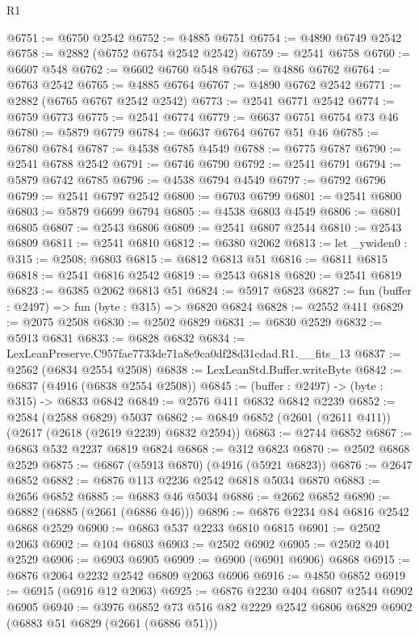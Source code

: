 \begin{lexlean}{R1}
\begin{coremodule}
@6751 := @6750 @2542
@6752 := @4885 @6751
@6754 := @4890 @6749 @2542
@6758 := @2882 (@6752 @6754 @2542 @2542)
@6759 := @2541 @6758
@6760 := @6607 @548
@6762 := @6602 @6760 @548
@6763 := @4886 @6762
@6764 := @6763 @2542
@6765 := @4885 @6764
@6767 := @4890 @6762 @2542
@6771 := @2882 (@6765 @6767 @2542 @2542)
@6773 := @2541 @6771 @2542
@6774 := @6759 @6773
@6775 := @2541 @6774
@6779 := @6637 @6751 @6754 @73 @46
@6780 := @5879 @6779
@6784 := @6637 @6764 @6767 @51 @46
@6785 := @6780 @6784
@6787 := @4538 @6785 @4549
@6788 := @6775 @6787
@6790 := @2541 @6788 @2542
@6791 := @6746 @6790
@6792 := @2541 @6791
@6794 := @5879 @6742 @6785
@6796 := @4538 @6794 @4549
@6797 := @6792 @6796
@6799 := @2541 @6797 @2542
@6800 := @6703 @6799
@6801 := @2541 @6800
@6803 := @5879 @6699 @6794
@6805 := @4538 @6803 @4549
@6806 := @6801 @6805
@6807 := @2543 @6806
@6809 := @2541 @6807 @2544
@6810 := @2543 @6809
@6811 := @2541 @6810
@6812 := @6380 @2062
@6813 := let _ywiden0 : @315 := @2508; @6803
@6815 := @6812 @6813 @51
@6816 := @6811 @6815
@6818 := @2541 @6816 @2542
@6819 := @2543 @6818
@6820 := @2541 @6819
@6823 := @6385 @2062 @6813 @51
@6824 := @5917 @6823
@6827 := fun (buffer : @2497) => fun (byte : @315) => @6820 @6824
@6828 := @2552 @411
@6829 := @2075 @2508
@6830 := @2502 @6829
@6831 := @6830 @2529
@6832 := @5913 @6831
@6833 := @6828 @6832
@6834 := LexLeanPreserve.C957fae7733de71a8e9ca0df28d31cdad.R1.__fits_13
@6837 := @2562 (@6834 @2554 @2508)
@6838 := LexLeanStd.Buffer.writeByte
@6842 := @6837 (@4916 (@6838 @2554 @2508))
@6845 := (buffer : @2497) -> (byte : @315) -> @6833 @6842
@6849 := @2576 @411 @6832 @6842 @2239
@6852 := @2584 (@2588 @6829) @5037
@6862 := @6849 @6852 (@2601 (@2611 @411)) (@2617 (@2618 (@2619 @2239) @6832 @2594))
@6863 := @2744 @6852
@6867 := @6863 @532 @2237 @6819 @6824
@6868 := @312 @6823
@6870 := @2502 @6868 @2529
@6875 := @6867 (@5913 @6870) (@4916 (@5921 @6823))
@6876 := @2647 @6852
@6882 := @6876 @113 @2236 @2542 @6818 @5034 @6870
@6883 := @2656 @6852
@6885 := @6883 @46 @5034
@6886 := @2662 @6852
@6890 := @6882 (@6885 (@2661 (@6886 @46)))
@6896 := @6876 @2234 @84 @6816 @2542 @6868 @2529
@6900 := @6863 @537 @2233 @6810 @6815
@6901 := @2502 @2063
@6902 := @104 @6803
@6903 := @2502 @6902
@6905 := @2502 @401 @2529
@6906 := @6903 @6905
@6909 := @6900 (@6901 @6906) @6868
@6915 := @6876 @2064 @2232 @2542 @6809 @2063 @6906
@6916 := @4850 @6852
@6919 := @6915 (@6916 @12 @2063)
@6925 := @6876 @2230 @404 @6807 @2544 @6902 @6905
@6940 := @3976
    @6852
    @73
    @516
    @82
    @2229
    @2542
    @6806
    @6829
    @6902
    (@6883 @51 @6829 (@2661 (@6886 @51)))

\end{coremodule}
\end{lexlean}
